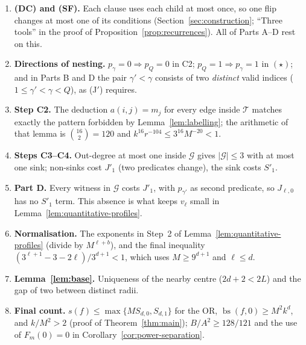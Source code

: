 \documentclass[11pt]{article}
\newcommand{\bs}{\operatorname{bs}}
\theoremstyle{definition}
\theoremstyle{remark}
\begin{document}
\begin{enumerate}[leftmargin=*,itemsep=2pt]
\item \textbf{(DC) and (SF).} Each clause uses each child at most once, so one
 flip changes at most one of its conditions
 (Section~\ref{sec:construction}; ``Three tools'' in the proof of
 Proposition~\ref{prop:recurrences}). All of Parts A--D rest on this.
\item \textbf{Directions of nesting.} $p_\gamma=0\Rightarrow p_Q=0$ in C2;
 $p_Q=1\Rightarrow p_\gamma=1$ in $(\star)$; and in Parts B and D the pair
 $\gamma'<\gamma$ consists of two \emph{distinct} valid indices
 ($1\le\gamma'<\gamma<Q$), as (J$'$) requires.
\item \textbf{Step C2.} The deduction $a(i,j)=m_j$ for every edge inside
 $\mathcal T$ matches exactly the pattern forbidden by
 Lemma~\ref{lem:labelling}; the arithmetic of that lemma is
 $\binom{16}{2}=120$ and $k^{16}r^{-104}\le3^{16}M^{-20}<1$.
\item \textbf{Steps C3--C4.} Out-degree at most one inside $\mathcal G$ gives
 $|\mathcal G|\le3$ with at most one sink; non-sinks cost $J'_1$ (two
 predicates change), the sink costs $S'_1$.
\item \textbf{Part D.} Every witness in $\mathcal G$ costs $J'_1$, with
 $p_{\gamma'}$ as second predicate, so $J_{\ell,0}$ has no $S'_1$ term. This
 absence is what keeps $v_\ell$ small in
 Lemma~\ref{lem:quantitative-profiles}.
\item \textbf{Normalisation.} The exponents in Step~2 of
 Lemma~\ref{lem:quantitative-profiles} (divide by $M^{\ell+b}$), and the final
 inequality $(3^{\ell+1}-3-2\ell)/3^{d+1}<1$, which uses $M\ge9^{d+1}$ and
 $\ell\le d$.
\item \textbf{Lemma~\ref{lem:base}.} Uniqueness of the nearby centre
 ($2d+2<2L$) and the gap of two between distinct radii.
\item \textbf{Final count.} $s(f)\le\max\{MS_{d,0},S_{d,1}\}$ for the OR,
 $\bs(f,0)\ge M^2k^d$, and $k/M^2>2$ (proof of Theorem~\ref{thm:main});
 $B/A^2\ge128/121$ and the use of $F_m(0)=0$ in
 Corollary~\ref{cor:power-separation}.
\end{enumerate}



\end{document}
